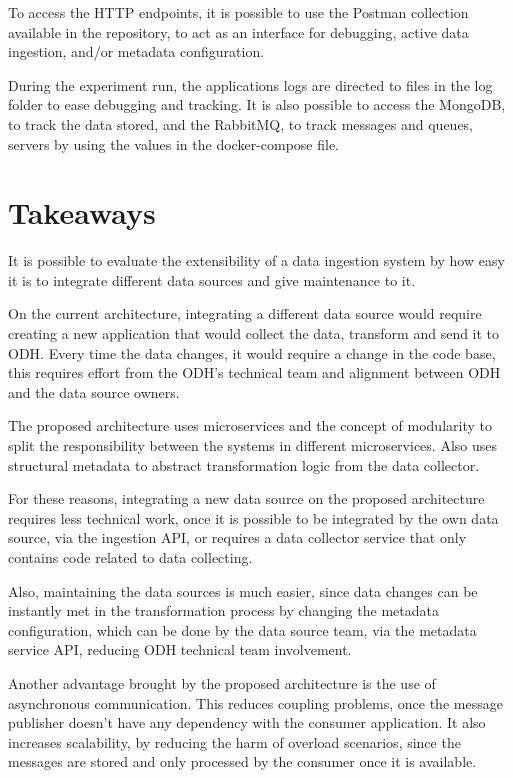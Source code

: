 To access the HTTP endpoints, it is possible to use the Postman collection available in the repository, to act as an interface for debugging, active data ingestion, and/or metadata configuration.

During the experiment run, the applications logs are directed to files in the log folder to ease debugging and tracking. It is also possible to access the MongoDB, to track the data stored, and the RabbitMQ, to track messages and queues, servers by using the values in the docker-compose file.

\section{Takeaways}
\label{sec:conc}

It is possible to evaluate the extensibility of a data ingestion system by how easy it is to integrate different data sources and give maintenance to it.

On the current architecture, integrating a different data source would require creating a new application that would collect the data, transform and send it to ODH. Every time the data changes, it would require a change in the code base, this requires effort from the ODH's technical team and alignment between ODH and the data source owners.

The proposed architecture uses microservices and the concept of modularity to split the responsibility between the systems in different microservices. Also uses structural metadata to abstract transformation logic from the data collector.

For these reasons, integrating a new data source on the proposed architecture requires less technical work, once it is possible to be integrated by the own data source, via the ingestion API, or requires a data collector service that only contains code related to data collecting.

Also, maintaining the data sources is much easier, since data changes can be instantly met in the transformation process by changing the metadata configuration, which can be done by the data source team, via the metadata service API, reducing ODH technical team involvement.

Another advantage brought by the proposed architecture is the use of asynchronous communication. This reduces coupling problems, once the message publisher doesn't have any dependency with the consumer application. It also increases scalability, by reducing the harm of overload scenarios, since the messages are stored and only processed by the consumer once it is available.

